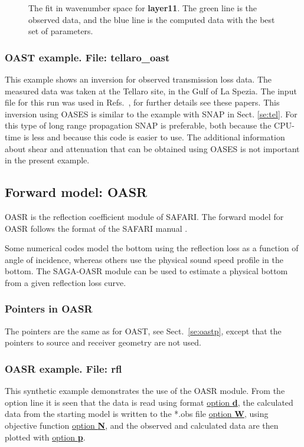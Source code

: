 \documentclass{saclantc}
\begin{document}
\begin{figure}
\epsfxsize=12cm
\centerline{}
\caption{The fit in wavenumber space  for {\bf layer11}. The green line is the observed data, and the
blue line is the computed data with  the best set of parameters.} 
\label{fig:layer11_fit}
\end{figure}

\subsubsection{OAST example. File: {\bf tellaro\_oast}}
\label{se:tellaro-oast}
This example shows an inversion for observed transmission loss data. 
The measured data was taken at the Tellaro site, in the Gulf of La
Spezia.  The input file for
this run was used in Refs.\ \cite{gerstoft:asa95,lambert}, for further
details see these papers. 
This inversion using { {\sf OASES}} is similar to 
the example with { {\sf SNAP}} in Sect. \ref{se:tel}.
For this type of long range propagation {\sf SNAP} is preferable, both
because 
the CPU-time is less and because this code is easier to use. 
The additional information about shear and attenuation that can be 
obtained using {\sf OASES} is not important in the present
example.


\subsection{Forward model: OASR }
{\sf OASR} is the reflection coefficient module of  {\sf SAFARI}.
The forward model for \sf OASR \rm follows 
the format of the {\sf SAFARI} manual \cite{hs:saf,hs:saf2}. 

Some numerical codes model the bottom using 
the   reflection  loss as a function
of angle of incidence, whereas others use the physical
sound speed profile in the bottom. The {\sf SAGA-OASR} module can be
used to estimate a physical bottom from  a given 
reflection  loss curve.

\subsubsection{Pointers in OASR}
The pointers are the same as for {\sf OAST}, see Sect.\ \ref{se:oastp}, 
except that the pointers to source and receiver geometry are not used.

\subsubsection{OASR example. File: {\bf rfl}}
\label{se:rfl}
This synthetic example demonstrates the use of the {\sf OASR} module.
From the option line it is seen that
the data is read using format \underline{option {\bf d}}, 
the calculated data from the starting 
model is written to the *.obs file \underline{option {\bf W}}, using
objective function \underline{option {\bf N}}, and 
the observed and calculated data are then plotted with \underline{option {\bf p}}.
\end{document}
